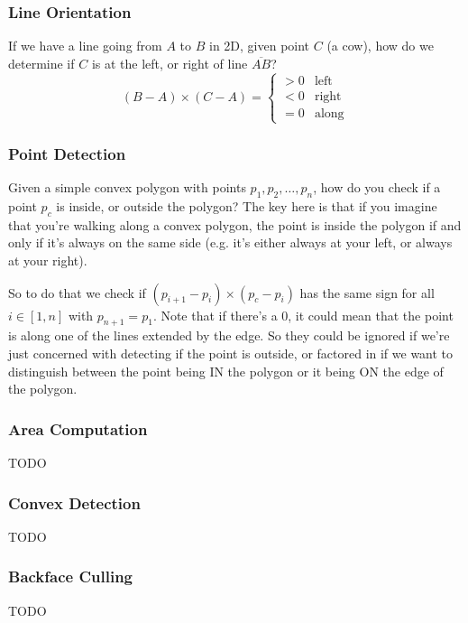 \documentclass[12pt]{report}
\begin{document}
	\subsubsection{Line Orientation}
	
	If we have a line going from $A$ to $B$ in 2D, given point $C$ (a cow), how do we determine if $C$ is at the left, or right of line $\overline{AB}$?
	$$
	(B - A) \times (C - A) = \begin{cases}
	> 0 & \text{left}\\
	< 0 & \text{right}\\
	= 0 & \text{along}
	\end{cases}
	$$
	\subsubsection{Point Detection}
	Given a simple convex polygon with points $p_1, p_2, \dots, p_n$, how do you check if a point $p_c$ is inside, or outside the polygon? The key here is that if you imagine that you're walking along a convex polygon, the point is inside the polygon if and only if it's always on the same side (e.g. it's either always at your left, or always at your right).
	
	So to do that we check if $(p_{i+1} - p_i) \times (p_c - p_i)$ has the same sign for all $i \in [1,n]$ with $p_{n + 1} = p_1$. Note that if there's a $0$, it could mean that the point is along one of the lines extended by the edge. So they could be ignored if we're just concerned with detecting if the point is outside, or factored in if we want to distinguish between the point being IN the polygon or it being ON the edge of the polygon.
	
	\subsubsection{Area Computation}
	TODO
	\subsubsection{Convex Detection}
	TODO
	\subsubsection{Backface Culling}
	TODO
\end{document}
